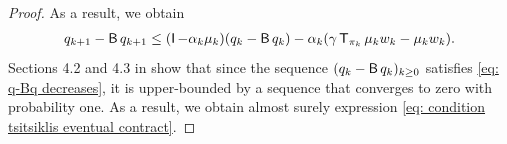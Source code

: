 \begin{proof}
    As a result, we obtain
    \begin{align}
    \label{eq: q-Bq decreases}
        q_{{k+1}} - \operatorname{\mathsf{B}} q_{{k+1}} \leq (\operatorname{\mathsf{I}} - \alpha_k \mu_k)(q_k - \operatorname{\mathsf{B}} q_k) - \alpha_k (\gamma \operatorname{\mathsf{T}}_{\pi_k} \mu_k w_k -  \mu_k w_k) .
    \end{align}
    Sections 4.2 and 4.3 in \citep{Bertsekas1996Neuro-DynamicProgramming} show that since the sequence $(q_k - \operatorname{\mathsf{B}} q_k)_{k \geq 0}$ satisfies \eqref{eq: q-Bq decreases}, it is upper-bounded by a sequence that converges to zero with probability one. As a result, we obtain almost surely expression \eqref{eq: condition tsitsiklis eventual contract}.
\end{proof}